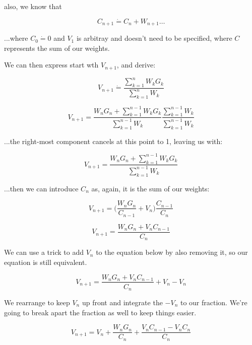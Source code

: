 \documentclass{article}
\begin{document}
also, we know that

\begin{equation}
    C_{n+1} \dot{=} C_n + W_{n+1}\dots
\end{equation}

...where $C_0 \dot{=} 0$ and $V_1$ is arbitray and doesn't need to be specified, where $C$ represents the sum of our weights.

We can then express start wth $V_{n+1}$, and derive:

\begin{equation}
    V_{n+1} \dot{=} \frac{\sum_{k=1}^{n}W_k G_k}{\sum_{k=1}^{n} W_k}
\end{equation}

\begin{equation}
    V_{n+1} = \frac{W_n G_n + \sum_{k=1}^{n-1}W_k G_k}{\sum_{k=1}^{n-1} W_k} \frac{\sum_{k=1}^{n-1}W_k}{\sum_{k=1}^{n-1} W_k}
\end{equation}

...the right-most component cancels at this point to 1, leaving us with:

\begin{equation}
    V_{n+1} = \frac{W_n G_n + \sum_{k=1}^{n-1}W_k G_k}{\sum_{k=1}^{n-1} W_k}
\end{equation}

...then we can introduce $C_n$ as, again, it is the sum of our weights:

\begin{equation}
    V_{n+1} = \bigg(\frac{W_n G_n}{C_{n-1}} + V_n \bigg) \frac{C_{n-1}}{C_n}
\end{equation}

\begin{equation}
    V_{n+1} = \frac{W_n G_n + V_n C_{n-1}}{C_n}
\end{equation}

We can use a trick to add $V_n$ to the equation below by also removing it, so our equation is still equivalent.

\begin{equation}
    V_{n+1} = \frac{W_n G_n + V_n C_{n-1}}{C_n} + V_n - V_n
\end{equation}

We rearrange to keep $V_n$ up front and integrate the $-V_n$ to our fraction. We're going to break apart the fraction as well to keep things easier.

\begin{equation}
    V_{n+1} = V_n + \frac{W_n G_n}{C_n} + \frac{V_n C_{n-1}- V_n C_n}{C_n}
\end{equation}
\end{document}
